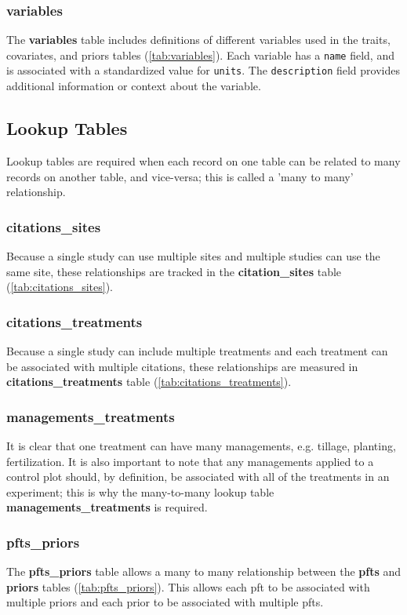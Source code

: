 \documentclass[10pt]{article}
\begin{document}
\subsubsection{variables} 
 The \textbf{variables} table includes definitions of different variables used in the traits, covariates, and priors tables  (\autoref{tab:variables}).
 Each variable has a \verb+name+ field, and is associated with a standardized value for \verb+units+.
 The \verb+description+ field provides additional information or context about the variable.

\subsection{Lookup Tables}

 Lookup tables are required when each record on one table can be related to many records on another table, and vice-versa; this is called a 'many to many' relationship.

\subsubsection{citations\_sites}
Because a single study can use multiple sites and multiple studies can use the same site, these relationships are tracked in the \textbf{citation\_sites} table (\autoref{tab:citations_sites}).

\subsubsection{citations\_treatments}
Because a single study can include multiple treatments and each treatment can be associated with multiple citations, these relationships are measured in \textbf{citations\_treatments} table (\autoref{tab:citations_treatments}).


\subsubsection{managements\_treatments}
 It is clear that one treatment can have many managements, e.g. tillage, planting, fertilization.
 It is also important to note that any managements applied to a control plot should, by definition, be associated with all of the treatments in an experiment; this is why the many-to-many lookup table \textbf{managements\_treatments} is required.

\subsubsection{pfts\_priors}
The \textbf{pfts\_priors} table allows a many to many relationship between the \textbf{pfts} and \textbf{priors} tables (\autoref{tab:pfts_priors}).
 This allows each pft to be associated with multiple priors and each prior to be associated with multiple pfts.
\end{document}
